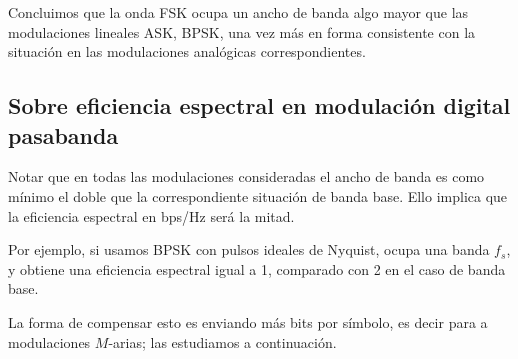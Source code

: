 %

Concluimos que la onda FSK ocupa un ancho de banda algo mayor que las modulaciones lineales ASK, BPSK, una vez más en
forma consistente con la situación en las modulaciones analógicas correspondientes.




\subsection*{Sobre eficiencia espectral en modulación digital
pasabanda}

Notar que en todas las modulaciones consideradas el ancho de banda
es como mínimo el doble que la correspondiente situación de banda base.
Ello implica que la eficiencia espectral en bps/Hz será la mitad.

Por ejemplo, si usamos BPSK con pulsos ideales de Nyquist, ocupa una banda $f_s$,
y obtiene una eficiencia espectral igual a 1, comparado con 2 en el caso de banda base.

La forma de compensar esto es enviando más bits por símbolo, es decir para a modulaciones $M$-arias;
las estudiamos a continuación.
